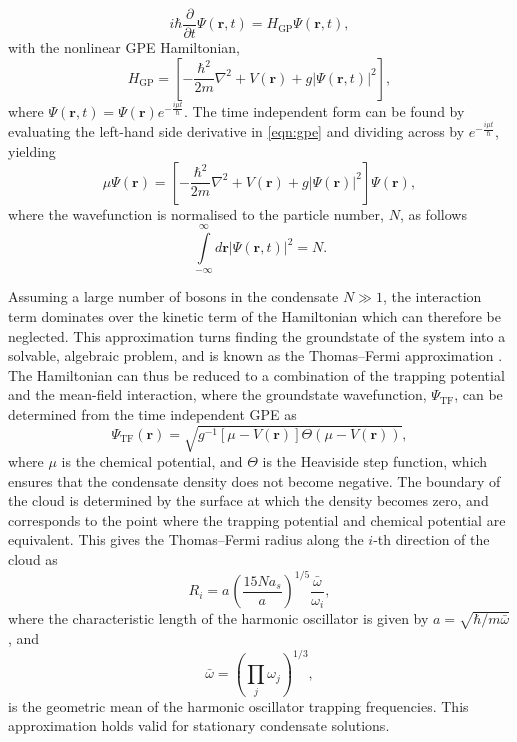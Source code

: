 \begin{equation}\label{eqn:gpe}
i\hbar\frac{\partial}{\partial t}\Psi(\mathbf{r},t) = H_{\textrm{GP}} \Psi(\textbf{r},t),
\end{equation}
with the nonlinear GPE Hamiltonian,
\begin{equation}\label{eqn:h_gp}
H_{\textrm{GP}} = \left[-\frac{\hbar^2}{2m}\nabla^2 + V(\textbf{r}) + g\vert\Psi(\mathbf{r},t)\vert^2 \right],
\end{equation}
where $\Psi(\textbf{r},t) = \Psi(\textbf{r})e^{-\frac{i\mu t}{\hbar}}$.
 The time independent form can be found by evaluating the left-hand side derivative in \eqref{eqn:gpe} and dividing across by $e^{-\frac{i\mu t}{\hbar}}$, yielding
\begin{equation}
\mu\Psi(\mathbf{r}) = \left[-\frac{\hbar^2}{2m}\nabla^2 + V(\mathbf{r}) + g\vert\Psi(\mathbf{r})\vert^2 \right]\Psi(\mathbf{r}),
\end{equation}
where the wavefunction is normalised to the particle number, $N$, as follows
\begin{equation}\label{eqn:norm}
\displaystyle\int\limits_{-\infty}^{\infty}d\mathbf{r} \left\vert \Psi\left(\mathbf{r},t\right) \right\vert^2 = N.
\end{equation}

Assuming a large number of bosons in the condensate $N\gg 1$, the interaction term dominates over the kinetic term of the Hamiltonian which can therefore be neglected. This approximation turns finding the groundstate of the system into a solvable, algebraic problem, and is known as the Thomas--Fermi approximation \cite[~p. 84]{BK:Ueda_2010}. The Hamiltonian can thus be reduced to a combination of the trapping potential and the mean-field interaction, where the groundstate wavefunction, $\Psi_{\textrm{TF}}$, can be determined from the time independent GPE as
\begin{equation}
\Psi_{\textrm{TF}}(\mathbf{r}) = \sqrt{ g^{-1}[\mu - V(\textbf{r})] \Theta(\mu - V(\textbf{r}))},
\end{equation}
where $\mu$ is the chemical potential, and $\Theta$ is the Heaviside step function, which ensures that the condensate density does not become negative. The boundary of the cloud is determined by the surface at which the density becomes zero, and corresponds to the point where the trapping potential and chemical potential are equivalent. This gives the Thomas--Fermi radius along the $i$-th direction of the cloud \cite[~p. 165]{BK:Pethick_Smith_2008} as
\begin{equation}
{R}_i = a_{\textrm{}}\left(\frac{15Na_s}{a_{\textrm{}}}\right)^{1/5}\frac{\bar{\omega}_{\textrm{}}}{\omega_i},
\end{equation}
where the characteristic length of the harmonic oscillator is given by
${a} = \sqrt{{\hbar}/{m\bar{\omega}}}$, and \[\bar{\omega} = \left(\displaystyle\prod\limits_j \omega_j\right)^{1/3},\] is the geometric mean of the harmonic oscillator trapping frequencies. This approximation holds valid for stationary condensate solutions.

